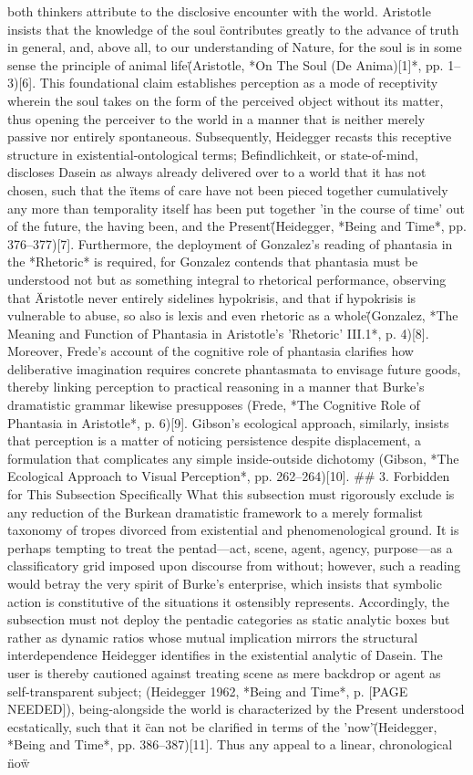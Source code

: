 {{both thinkers attribute to the disclosive encounter with the world. Aristotle insists that the knowledge of the soul \"contributes greatly to the advance of truth in general, and, above all, to our understanding of Nature, for the soul is in some sense the principle of animal life\" (Aristotle, *On The Soul (De Anima)[1]*, pp. 1–3)[6]. This foundational claim establishes perception as a mode of receptivity wherein the soul takes on the form of the perceived object without its matter, thus opening the perceiver to the world in a manner that is neither merely passive nor entirely spontaneous. Subsequently, Heidegger recasts this receptive structure in existential-ontological terms; Befindlichkeit, or state-of-mind, discloses Dasein as always already delivered over to a world that it has not chosen, such that the \"items of care have not been pieced together cumulatively any more than temporality itself has been put together 'in the course of time' out of the future, the having been, and the Present\" (Heidegger, *Being and Time*, pp. 376–377)[7]. Furthermore, the deployment of Gonzalez's reading of phantasia in the *Rhetoric* is required, for Gonzalez contends that phantasia must be understood not but as something integral to rhetorical performance, observing that \"Aristotle never entirely sidelines hypokrisis, and that if hypokrisis is vulnerable to abuse, so also is lexis and even rhetoric as a whole\" (Gonzalez, *The Meaning and Function of Phantasia in Aristotle's 'Rhetoric' III.1*, p. 4)[8]. Moreover, Frede's account of the cognitive role of phantasia clarifies how deliberative imagination requires concrete phantasmata to envisage future goods, thereby linking perception to practical reasoning in a manner that Burke's dramatistic grammar likewise presupposes (Frede, *The Cognitive Role of Phantasia in Aristotle*, p. 6)[9]. Gibson's ecological approach, similarly, insists that perception is a matter of noticing persistence despite displacement, a formulation that complicates any simple inside-outside dichotomy (Gibson, *The Ecological Approach to Visual Perception*, pp. 262–264)[10]. \n\n## 3. Forbidden for This Subsection Specifically What this subsection must rigorously exclude is any reduction of the Burkean dramatistic framework to a merely formalist taxonomy of tropes divorced from existential and phenomenological ground. It is perhaps tempting to treat the pentad—act, scene, agent, agency, purpose—as a classificatory grid imposed upon discourse from without; however, such a reading would betray the very spirit of Burke's enterprise, which insists that symbolic action is constitutive of the situations it ostensibly represents. Accordingly, the subsection must not deploy the pentadic categories as static analytic boxes but rather as dynamic ratios whose mutual implication mirrors the structural interdependence Heidegger identifies in the existential analytic of Dasein. The user is thereby cautioned against treating scene as mere backdrop or agent as self-transparent subject; (Heidegger 1962, *Being and Time*, p. [PAGE NEEDED]), being-alongside the world is characterized by the Present understood ecstatically, such that it \"can not be clarified in terms of the 'now'\" (Heidegger, *Being and Time*, pp. 386–387)[11]. Thus any appeal to a linear, chronological \"now\" }}
